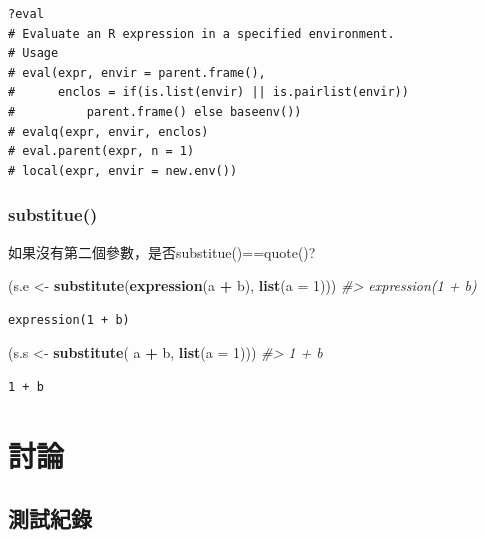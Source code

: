 \documentclass[]{book}
\newenvironment{Shaded}{\begin{snugshade}}{\end{snugshade}}
\newcommand{\CommentTok}[1]{\textcolor[rgb]{0.56,0.35,0.01}{\textit{#1}}}
\newcommand{\DataTypeTok}[1]{\textcolor[rgb]{0.13,0.29,0.53}{#1}}
\newcommand{\DecValTok}[1]{\textcolor[rgb]{0.00,0.00,0.81}{#1}}
\newcommand{\KeywordTok}[1]{\textcolor[rgb]{0.13,0.29,0.53}{\textbf{#1}}}
\newcommand{\NormalTok}[1]{#1}
\newcommand{\OperatorTok}[1]{\textcolor[rgb]{0.81,0.36,0.00}{\textbf{#1}}}
\newcommand{\StringTok}[1]{\textcolor[rgb]{0.31,0.60,0.02}{#1}}
\theoremstyle{definition}
\theoremstyle{definition}
\theoremstyle{definition}
\theoremstyle{remark}
\begin{document}
\begin{verbatim}
?eval
# Evaluate an R expression in a specified environment.
# Usage
# eval(expr, envir = parent.frame(),
#      enclos = if(is.list(envir) || is.pairlist(envir))
#          parent.frame() else baseenv())
# evalq(expr, envir, enclos)
# eval.parent(expr, n = 1)
# local(expr, envir = new.env())
\end{verbatim}

\hypertarget{substitue}{%
\subsubsection{substitue()}\label{substitue}}

如果沒有第二個參數，是否substitue()==quote()?

\begin{Shaded}
\begin{Highlighting}[]
\NormalTok{(s.e <-}\StringTok{ }\KeywordTok{substitute}\NormalTok{(}\KeywordTok{expression}\NormalTok{(a }\OperatorTok{+}\StringTok{ }\NormalTok{b), }\KeywordTok{list}\NormalTok{(}\DataTypeTok{a =} \DecValTok{1}\NormalTok{)))  }\CommentTok{#> expression(1 + b)}
\end{Highlighting}
\end{Shaded}

\begin{verbatim}
expression(1 + b)
\end{verbatim}

\begin{Shaded}
\begin{Highlighting}[]
\NormalTok{(s.s <-}\StringTok{ }\KeywordTok{substitute}\NormalTok{( a }\OperatorTok{+}\StringTok{ }\NormalTok{b,            }\KeywordTok{list}\NormalTok{(}\DataTypeTok{a =} \DecValTok{1}\NormalTok{)))  }\CommentTok{#> 1 + b}
\end{Highlighting}
\end{Shaded}

\begin{verbatim}
1 + b
\end{verbatim}

\section{討論}

\subsection{測試紀錄}
\end{document}
